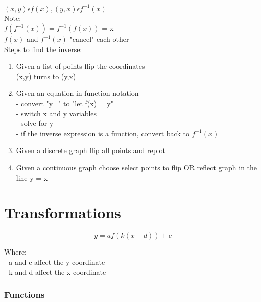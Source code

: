 \documentclass{article}
\begin{document}
$(x,y) \epsilon f(x), (y,x) \epsilon f^{-1}(x)$\\

\noindent
Note:\\
$f(f^{-1}(x)) = f^{-1}(f(x))$ = x\\
$f(x)$ and $f^{-1}(x)$ "cancel" each other\\

\noindent
Steps to find the inverse:
\begin{enumerate}
    \item Given a list of points flip the coordinates\\
        (x,y) turns to (y,x)
    \item Given an equation in function notation\\
        - convert "y=" to "let f(x) = y"\\
        - switch x and y variables\\
        - solve for y\\
        - if the inverse expression is a function, convert back to $f^{-1}(x)$
    \item Given a discrete graph flip all points and replot
    \item Given a continuous graph choose select points to flip OR reflect graph in the line y = x
\end{enumerate} 


\section{Transformations}

    \[ y = af(k(x-d))+c \]

    \noindent
    Where:\\
    - a and c affect the y-coordinate\\
    - k and d affect the x-coordinate

    \subsubsection*{Functions}
\end{document}
